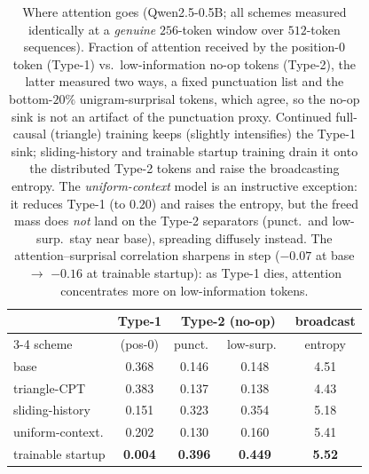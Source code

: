 \begin{table}[t]
\centering
\small
\setlength{\tabcolsep}{4pt}
\begin{tabular}{lcccc}
\toprule
 & Type-1 & \multicolumn{2}{c}{Type-2 (no-op)} & broadcast \\
\cmidrule(lr){3-4}
scheme & (pos-0) & punct.\ & low-surp.\ & entropy \\
\midrule
base         & 0.368 & 0.146 & 0.148 & 4.51 \\
triangle-CPT & 0.383 & 0.137 & 0.138 & 4.43 \\
sliding-history     & 0.151 & 0.323 & 0.354 & 5.18 \\
uniform-context. & 0.202 & 0.130 & 0.160 & 5.41 \\
trainable startup      & \textbf{0.004} & \textbf{0.396} & \textbf{0.449} & \textbf{5.52} \\
\bottomrule
\end{tabular}
\caption{Where attention goes (Qwen2.5-0.5B; all schemes measured identically at a \emph{genuine} $256$-token window over $512$-token sequences). Fraction of attention received by the position-0 token (Type-1) vs.\ low-information no-op tokens (Type-2), the latter measured two ways, a fixed punctuation list and the bottom-$20\%$ unigram-surprisal tokens, which agree, so the no-op sink is not an artifact of the punctuation proxy. Continued full-causal (triangle) training keeps (slightly intensifies) the Type-1 sink; sliding-history and trainable startup training drain it onto the distributed Type-2 tokens and raise the broadcasting entropy. The \emph{uniform-context} model is an instructive exception: it reduces Type-1 (to $0.20$) and raises the entropy, but the freed mass does \emph{not} land on the Type-2 separators (punct.\ and low-surp.\ stay near base), spreading diffusely instead. The attention--surprisal correlation sharpens in step ($-0.07$ at base $\to$ $-0.16$ at trainable startup): as Type-1 dies, attention concentrates more on low-information tokens.}
\label{tab:spread}
\end{table}

